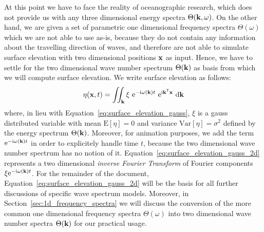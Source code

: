 At this point we have to face the reality of oceanographic research, which does 
not provide us with any three dimensional energy spectra 
$\Theta(\mathbf{k},\omega)$. On the other hand, we are given a set of 
parametric one dimensional frequency spectra $\Theta(\omega)$ which we are not 
able to use as-is, because they do not contain any information about the 
travelling direction of waves, and therefore are not able to simulate 
surface elevation with two dimensional positions $\mathbf{x}$ as input. Hence, we 
have to settle for the two dimensional wave number spectrum $\Theta(\mathbf{k})$ 
as basis from which we will compute surface elevation. We write surface 
elevation as follows:
\begin{equation}
\label{eq:surface_elevation_gauss_2d}
 \eta(\mathbf{x}, t) = \iint_{\mathbf{k}} 
\xi~\mathrm{e}^{-\mathrm{i}\omega(\mathbf{k}) t}
~\mathrm{e}^{\mathrm{i}\mathbf{k}^{\mathsf{T}}\mathbf{x}}~\mathrm{d}\mathbf{k}
\end{equation}
where, in lieu with Equation~\ref{eq:surface_elevation_gauss}, $\xi$ is 
a gauss distributed variable with mean $\mathrm{E}[\eta] = 0$ and
variance $\mathrm{Var}[\eta] = \sigma^2$ defined by the energy spectrum
$\Theta(\mathbf{k})$. Moreover, for animation purposes, we add the term 
$\mathrm{e}^{-\mathrm{i}\omega(\mathbf{k}) t}$ in order to explicitely handle 
time $t$, because the two dimensional wave number spectrum has no notion of 
it. Equation~\ref{eq:surface_elevation_gauss_2d} represents a two dimensional 
\emph{inverse Fourier Transform} of Fourier components 
$\xi\mathrm{e}^{-\mathrm{i}\omega(\mathbf{k}) t}$. For the remainder of the 
document, Equation~\ref{eq:surface_elevation_gauss_2d} will be the basis for all 
further discussions of specific wave spectrum models. Moreover, in 
Section~\ref{sec:1d_frequency_spectra} we will discuss the conversion of the 
more common one dimensional frequency spectra $\Theta(\omega)$ into two 
dimensional wave number spectra $\Theta(\mathbf{k})$ for our practical usage.
%
